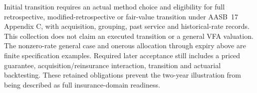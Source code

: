 Initial transition requires an actual method choice and eligibility for full retrospective, modified-retrospective or fair-value transition under AASB~17 Appendix C, with acquisition, grouping, past service and historical-rate records. This collection does not claim an executed transition or a general VFA valuation. The nonzero-rate general case and onerous allocation through expiry above are finite specification examples. Required later acceptance still includes a priced guarantee, acquisition/reinsurance interaction, transition and actuarial backtesting. These retained obligations prevent the two-year illustration from being described as full insurance-domain readiness.

